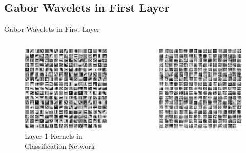 \documentclass{beamer}
\begin{document}
\subsection{Gabor Wavelets in First Layer}
\begin{frame}{Gabor Wavelets in First Layer}
\begin{columns}
\begin{column}{0.48\textwidth}
\begin{figure}
\centering
\includegraphics[width=\textwidth]{images/alexnet_classification_l1_kernels.png}
\caption{Layer 1 Kernels in Classification Network}
\end{figure}
\end{column}
\begin{column}{0.48\textwidth}
\begin{figure}
\centering
\includegraphics[width=\textwidth]{images/alexnet_vae_l1_kernels.png}

\end{figure}
\end{column}
\end{columns}
\end{frame}
\end{document}
